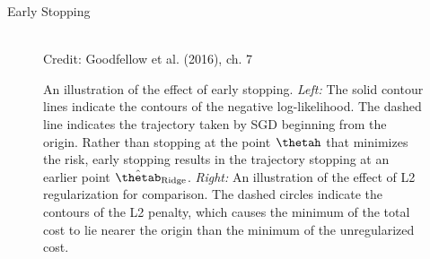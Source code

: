 \begin{vbframe}{Early Stopping}
  \begin{figure}
    \centering
      \tiny{\\ Credit: Goodfellow et al. (2016), ch. 7}
      \caption{\footnotesize An illustration of the effect of early stopping. \textit{Left:} The solid contour lines indicate the contours of the negative log-likelihood. The dashed line indicates the trajectory taken by SGD beginning from the origin. Rather than stopping at the point $\thetah$ that minimizes the risk, early stopping results in the trajectory stopping at an earlier point $\hat{\thetab}_{\text{Ridge}}$. \textit{Right:} An illustration of the effect of L2 regularization for comparison. The dashed circles indicate the contours of the L2 penalty, which causes the minimum of the total cost to lie nearer the origin than the minimum of the unregularized cost.}
  \end{figure}
\end{vbframe}

\endlecture
